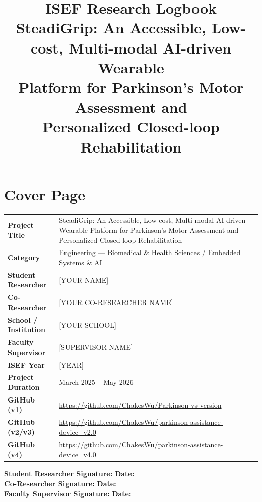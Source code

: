 \documentclass[12pt,a4paper]{article}
\title{%
  \vspace{-1cm}
  {\LARGE\bfseries ISEF Research Logbook}\\[0.5em]
  {\large SteadiGrip: An Accessible, Low-cost, Multi-modal AI-driven Wearable\\
   Platform for Parkinson's Motor Assessment and\\
   Personalized Closed-loop Rehabilitation}
}
\author{}
\date{}
\begin{document}
\maketitle
\thispagestyle{fancy}

\tableofcontents
\newpage

\section*{Cover Page}

\begin{tabularx}{\linewidth}{@{}>{\bfseries}p{5cm} X@{}}
Project Title       & SteadiGrip: An Accessible, Low-cost, Multi-modal AI-driven Wearable Platform for Parkinson's Motor Assessment and Personalized Closed-loop Rehabilitation \\[4pt]
Category            & Engineering --- Biomedical \& Health Sciences / Embedded Systems \& AI \\[4pt]
Student Researcher  & {[YOUR NAME]} \\[4pt]
Co-Researcher       & {[YOUR CO-RESEARCHER NAME]} \\[4pt]
School / Institution& {[YOUR SCHOOL]} \\[4pt]
Faculty Supervisor  & {[SUPERVISOR NAME]} \\[4pt]
ISEF Year           & {[YEAR]} \\[4pt]
Project Duration    & March 2025 -- May 2026 \\[4pt]
GitHub (v1)         & \url{https://github.com/ChakesWu/Parkinson-vs-version} \\[4pt]
GitHub (v2/v3)      & \url{https://github.com/ChakesWu/parkinson-assistance-device_v2.0} \\[4pt]
GitHub (v4)         & \url{https://github.com/ChakesWu/parkinson-assistance-device_v4.0} \\
\end{tabularx}

\vspace{1.5em}
\noindent\textbf{Student Researcher Signature:} \underline{\hspace{5.5cm}} \quad \textbf{Date:} \underline{\hspace{3cm}}\\[0.6em]
\noindent\textbf{Co-Researcher Signature:} \underline{\hspace{5.8cm}} \quad \textbf{Date:} \underline{\hspace{3cm}}\\[0.6em]
\noindent\textbf{Faculty Supervisor Signature:} \underline{\hspace{5.2cm}} \quad \textbf{Date:} \underline{\hspace{3cm}}
\end{document}
